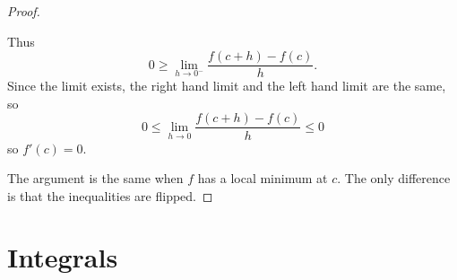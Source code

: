 \documentclass[11pt]{book}
\numberwithin{example}{chapter}
\begin{document}
\begin{proof}
\begin{center}
\end{center}


Thus $$0\geq \lim_{h\to 0^-}\frac{f(c+h)-f(c)}{h}.$$
Since the limit exists, the right hand limit and the left hand limit are the same, so 
$$0\leq \lim_{h\to 0}\frac{f(c+h)-f(c)}{h} \leq 0$$
so $f'(c)=0$.

The argument is the same when $f$ has a local minimum at $c$.  The only difference is that the inequalities are flipped.  

\end{proof}








\chapter{Integrals}  
\end{document}
